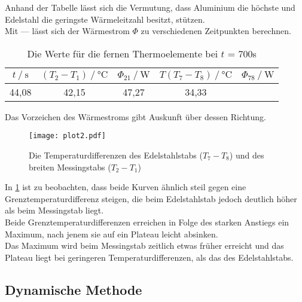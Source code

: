 Anhand der Tabelle lässt sich die Vermutung, dass Aluminium die höchste und 
Edelstahl die geringste Wärmeleitzahl besitzt, stützen. \\

Mit --- lässt sich der Wärmestrom $\Phi$ zu verschiedenen Zeitpunkten berechnen. \\

\begin{table}[H]   %
  \centering
  \caption{Die Werte für die fernen Thermoelemente bei $t$ = 700s}
  \begin{tabular}{ccccc}
    \toprule
    {$t \mathbin{/} \unit{\second}$} &
    {$(T_2 - T_1) \mathbin{/} \unit{\degreeCelsius}$} &    %
    {$\Phi_{21} \mathbin{/} \unit{\watt}$} &
    {$T(T_7 - T_8) \mathbin{/} \unit{\degreeCelsius}$} &
    {$\Phi_{78} \mathbin{/} \unit{\watt}$} \\
    \midrule
    44,08 & 42,15 & 47,27 & 34,33 & \\   
    \bottomrule
  \end{tabular}
  \label{tab:Tabelle2}
\end{table}

Das Vorzeichen des Wärmestroms gibt Auskunft über dessen Richtung.\\


\begin{figure}[H]
  \centering
  \texttt{[image: plot2.pdf]}
  \caption{Die Temperaturdifferenzen des Edelstahlstabs ($T_7 - T_8$) und des breiten Messingstabs ($T_2 - T_1$)}
  \label{fig:plot2}
\end{figure}

In \ref{fig:plot2} ist zu beobachten, dass beide Kurven ähnlich 
steil gegen eine Grenztemperaturdifferenz steigen, die beim Edelstahlstab jedoch deutlich höher
als beim Messingstab liegt.\\ 
Beide Grenztemperaturdifferenzen erreichen in Folge des 
starken Anstiegs ein Maximum, nach jenem sie auf ein Plateau leicht absinken. \\
Das Maximum wird beim Messingstab zeitlich etwas früher erreicht und das Plateau liegt bei 
geringeren Temperaturdifferenzen, als das des Edelstahlstabs.\\


\subsection{Dynamische Methode}
\label{Dynamische Methode}

